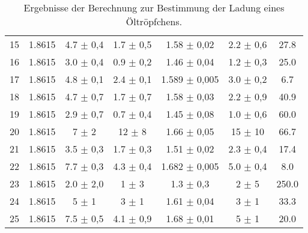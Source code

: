 \begin{landscape}
\begin{table}
\begin{center}
\begin{tabular}{c S[table-format=1.4] S[table-format=1.1] S[table-format=1.2] S[table-format=1.3] S[table-format=1.2] S[table-format=3.1]}
15  & 1.8615  & 4.7 $\pm$ 0,4  & 1.7  $\pm$ 0,5  & 1.58   $\pm$ 0,02  &  2.2 $\pm$   0,6  &   27.8\\
16  & 1.8615  & 3.0 $\pm$ 0,4  & 0.9  $\pm$ 0,2  & 1.46   $\pm$ 0,04  &  1.2 $\pm$   0,3  &   25.0\\
17  & 1.8615  & 4.8 $\pm$ 0,1  & 2.4  $\pm$ 0,1  & 1.589  $\pm$ 0,005 &  3.0 $\pm$   0,2  &    6.7\\
18  & 1.8615  & 4.7 $\pm$ 0,7  & 1.7  $\pm$ 0,7  & 1.58   $\pm$ 0,03  &  2.2 $\pm$   0,9  &   40.9\\
19  & 1.8615  & 2.9 $\pm$ 0,7  & 0.7  $\pm$ 0,4  & 1.45   $\pm$ 0,08  &  1.0 $\pm$   0,6  &   60.0\\
20  & 1.8615  & 7   $\pm$ 2    & 12   $\pm$ 8    & 1.66   $\pm$ 0,05  & 15   $\pm$ 10     &   66.7\\
21  & 1.8615  & 3.5 $\pm$ 0,3  & 1.7  $\pm$ 0,3  & 1.51   $\pm$ 0,02  &  2.3 $\pm$   0,4  &   17.4\\
22  & 1.8615  & 7.7 $\pm$ 0,3  & 4.3  $\pm$ 0,4  & 1.682  $\pm$ 0,005 &  5.0 $\pm$   0,4  &    8.0\\
23  & 1.8615  & 2.0 $\pm$ 2,0  & 1    $\pm$ 3    & 1.3    $\pm$ 0,3   &  2   $\pm$   5    &  250.0\\
24  & 1.8615  & 5   $\pm$ 1    & 3    $\pm$ 1    & 1.61   $\pm$ 0,04  &  3   $\pm$   1    &   33.3\\
25  & 1.8615  & 7.5 $\pm$ 0,5  & 4.1  $\pm$ 0,9  & 1.68   $\pm$ 0,01  &  5   $\pm$   1    &   20.0\\
		\bottomrule
           \bottomrule
            \end{tabular}
\caption{Ergebnisse der Berechnung zur Bestimmung der Ladung eines Öltröpfchens.}
        \label{tab:ergebnisse}
  \end{center}
    \end{table}
\end{landscape}
